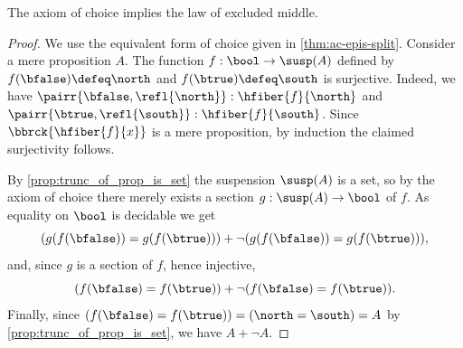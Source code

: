 %
\begin{thm}[Diaconescu]\label{thm:1surj_to_surj_to_pem}
  The axiom of choice implies the law of excluded middle.
\end{thm}

\begin{proof}
We use the equivalent form of choice given in \cref{thm:ac-epis-split}.
Consider a mere proposition $A$.
The function $f:\bool\to\susp(A)$ defined by
$f(\bfalse) \defeq \north$ and $f(\btrue) \defeq \south$
is surjective.
Indeed, we have
$\pairr{\bfalse,\refl{\north}} : \hfiber{f}{\north}$
and $\pairr{\btrue,\refl{\south}} :\hfiber{f}{\south}$.
Since $\bbrck{\hfiber{f}{x}}$ is a mere proposition, by induction the claimed surjectivity follows.

By \cref{prop:trunc_of_prop_is_set} the suspension $\susp(A)$
is a set, so by the axiom of choice there merely exists a
section $g: \susp(A) \to \bool$ of $f$.
As equality on $\bool$ is decidable we get
\begin{equation*}
 (g(f(\bfalse))= g(f(\btrue))) +
 \lnot (g(f(\bfalse))= g(f(\btrue))),
\end{equation*}
and, since $g$ is a section of $f$, hence injective,
\begin{equation*}
(f(\bfalse) = f(\btrue)) +
\lnot (f(\bfalse) = f(\btrue)).
\end{equation*}
Finally, since $(f(\bfalse)=f(\btrue)) = (\north=\south) = A$ by \cref{prop:trunc_of_prop_is_set}, we have $A+\neg A$.
\end{proof}
